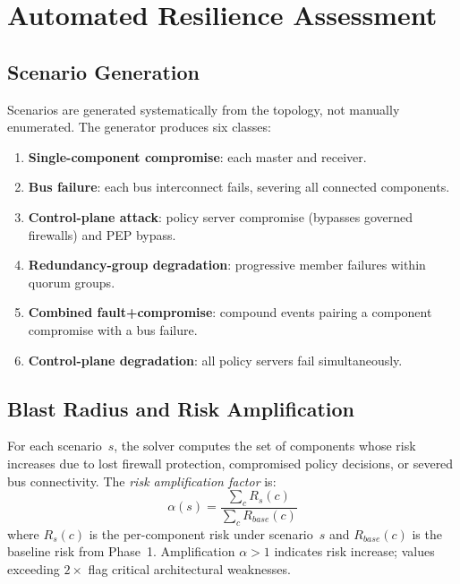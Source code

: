 \documentclass[conference]{IEEEtran}
\begin{document}
\section{Automated Resilience Assessment}

\subsection{Scenario Generation}

Scenarios are generated systematically from the topology, not manually
enumerated. The generator produces six classes:

\begin{enumerate}
\item \textbf{Single-component compromise}: each master and receiver.
\item \textbf{Bus failure}: each bus interconnect fails, severing all
  connected components.
\item \textbf{Control-plane attack}: policy server compromise (bypasses
  governed firewalls) and PEP bypass.
\item \textbf{Redundancy-group degradation}: progressive member failures
  within quorum groups.
\item \textbf{Combined fault+compromise}: compound events pairing a
  component compromise with a bus failure.
\item \textbf{Control-plane degradation}: all policy servers fail
  simultaneously.
\end{enumerate}

\subsection{Blast Radius and Risk Amplification}

For each scenario~$s$, the solver computes the set of components whose
risk increases due to lost firewall protection, compromised policy
decisions, or severed bus connectivity. The \emph{risk amplification
factor} is:
\begin{equation}
\alpha(s) = \frac{\sum_{c} R_s(c)}{\sum_{c} R_{\mathit{base}}(c)}
\label{eq:amplification}
\end{equation}
where $R_s(c)$ is the per-component risk under scenario~$s$ and
$R_{\mathit{base}}(c)$ is the baseline risk from Phase~1. Amplification
$\alpha > 1$ indicates risk increase; values exceeding $2\times$ flag
critical architectural weaknesses.
\end{document}
